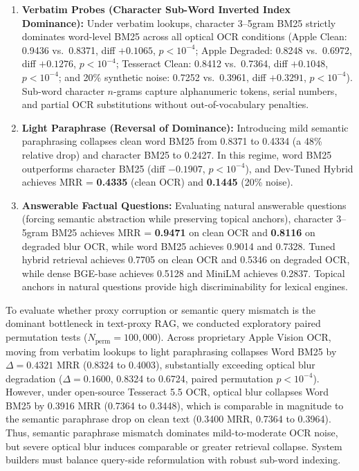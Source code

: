 \documentclass[conference]{IEEEtran}
\begin{document}
\begin{enumerate}
    \setlength{\itemsep}{0.2pt plus 0.1pt}
    \setlength{\parskip}{0pt}
    \item \textbf{Verbatim Probes (Character Sub-Word Inverted Index Dominance):} Under verbatim lookups, character 3--5gram BM25 strictly dominates word-level BM25 across all optical OCR conditions (Apple Clean: 0.9436 vs.\ 0.8371, diff $+0.1065$, $p < 10^{-4}$; Apple Degraded: 0.8248 vs.\ 0.6972, diff $+0.1276$, $p < 10^{-4}$; Tesseract Clean: 0.8412 vs.\ 0.7364, diff $+0.1048$, $p < 10^{-4}$; and 20\% synthetic noise: 0.7252 vs.\ 0.3961, diff $+0.3291$, $p < 10^{-4}$). Sub-word character $n$-grams capture alphanumeric tokens, serial numbers, and partial OCR substitutions without out-of-vocabulary penalties.
    \item \textbf{Light Paraphrase (Reversal of Dominance):} Introducing mild semantic paraphrasing collapses clean word BM25 from 0.8371 to 0.4334 (a 48\% relative drop) and character BM25 to 0.2427. In this regime, word BM25 outperforms character BM25 (diff $-0.1907$, $p < 10^{-4}$), and Dev-Tuned Hybrid achieves MRR = \textbf{0.4335} (clean OCR) and \textbf{0.1445} (20\% noise).
    \item \textbf{Answerable Factual Questions:} Evaluating natural answerable questions (forcing semantic abstraction while preserving topical anchors), character 3--5gram BM25 achieves MRR = \textbf{0.9471} on clean OCR and \textbf{0.8116} on degraded blur OCR, while word BM25 achieves 0.9014 and 0.7328. Tuned hybrid retrieval achieves 0.7705 on clean OCR and 0.5346 on degraded OCR, while dense BGE-base achieves 0.5128 and MiniLM achieves 0.2837. Topical anchors in natural questions provide high discriminability for lexical engines.
\end{enumerate}

To evaluate whether proxy corruption or semantic query mismatch is the dominant bottleneck in text-proxy RAG, we conducted exploratory paired permutation tests ($N_{\text{perm}}=100{,}000$). Across proprietary Apple Vision OCR, moving from verbatim lookups to light paraphrasing collapses Word BM25 by $\Delta = 0.4321$ MRR (0.8324 to 0.4003), substantially exceeding optical blur degradation ($\Delta = 0.1600$, 0.8324 to 0.6724, paired permutation $p < 10^{-4}$). However, under open-source Tesseract 5.5 OCR, optical blur collapses Word BM25 by 0.3916 MRR (0.7364 to 0.3448), which is comparable in magnitude to the semantic paraphrase drop on clean text (0.3400 MRR, 0.7364 to 0.3964). Thus, semantic paraphrase mismatch dominates mild-to-moderate OCR noise, but severe optical blur induces comparable or greater retrieval collapse. System builders must balance query-side reformulation with robust sub-word indexing.
\end{document}
